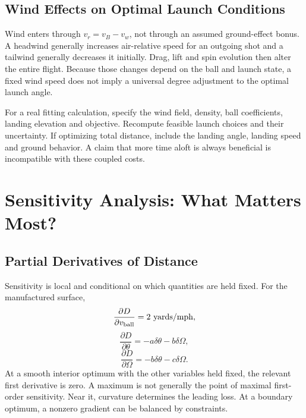 \subsection{Wind Effects on Optimal Launch Conditions}

Wind enters through $v_r=v_B-v_w$, not through an assumed ground-effect bonus.
A headwind generally increases air-relative speed for an outgoing shot and
a tailwind generally decreases it initially. Drag, lift and spin evolution
then alter the entire flight. Because those changes depend on the ball and
launch state, a fixed wind speed does not imply a universal degree adjustment
to the optimal launch angle.

For a real fitting calculation, specify the wind field, density, ball
coefficients, landing elevation and objective. Recompute feasible launch
choices and their uncertainty. If optimizing total distance, include the
landing angle, landing speed and ground behavior. A claim that more time
aloft is always beneficial is incompatible with these coupled costs.

\section{Sensitivity Analysis: What Matters Most?}
\label{sec:launch_sensitivity}

\subsection{Partial Derivatives of Distance}

Sensitivity is local and conditional on which quantities are held fixed.
For the manufactured surface,
\begin{equation}
\frac{\partial D}{\partial v_{\rm ball}}=2\ {\rm yards/mph},
\label{eq:sensitivity_speed}
\end{equation}
\begin{equation}
\frac{\partial D}{\partial\theta}=-a\delta\theta-b\delta\Omega,
\label{eq:sensitivity_angle}
\end{equation}
\begin{equation}
\frac{\partial D}{\partial\Omega}=-b\delta\theta-c\delta\Omega.
\label{eq:sensitivity_spin}
\end{equation}
At a smooth interior optimum with the other variables held fixed, the relevant
first derivative is zero. A maximum is not generally the point of maximal
first-order sensitivity. Near it, curvature determines the leading loss.
At a boundary optimum, a nonzero gradient can be balanced by constraints.

